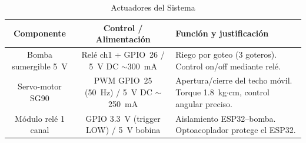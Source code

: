 \begin{table}[tp]
\centering
\renewcommand{\arraystretch}{1.3}
\caption{Actuadores del Sistema}
\label{tab:actuadores}
\begin{tabularx}{\textwidth}{|c|c|X|}
\hline
\textbf{Componente} & \textbf{Control / Alimentación} & \textbf{Función y justificación} \\
\hline
Bomba sumergible 5~V & Relé ch1 + GPIO~26 / 5~V DC $\sim$300~mA & Riego por goteo (3 goteros). Control on/off mediante relé. \\
\hline
Servo-motor SG90 & PWM GPIO~25 (50~Hz) / 5~V DC $\sim$250~mA & Apertura/cierre del techo móvil. Torque 1.8~kg$\cdot$cm, control angular preciso. \\
\hline
Módulo relé 1 canal & GPIO 3.3~V (trigger LOW) / 5~V bobina & Aislamiento ESP32--bomba. Optoacoplador protege el ESP32. \\
\hline
\end{tabularx}
\end{table}